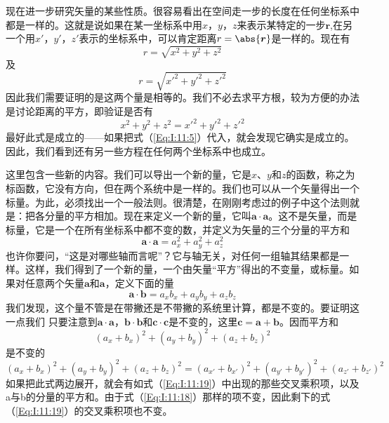 现在进一步研究矢量的某些性质。很容易看出在空间走一步的长度在任何坐标系中都是一样的。这就是说如果在某一坐标系中用$x$，$y$，$z$来表示某特定的一步$\boldsymbol{r}$,在另一个用$x'$，$y'$，$z'$表示的坐标系中，可以肯定距离$r=\abs{\boldsymbol{r}}$是一样的。现在有
\begin{equation*}
    r=\sqrt{x^2+y^2+z^2}
\end{equation*}
及
\begin{equation*}
    r=\sqrt{x'^2+y'^2+z'^2}
\end{equation*}
因此我们需要证明的是这两个量是相等的。我们不必去求平方根，较为方便的办法是讨论距离的平方，即验证是否有
\begin{equation}
    \label{Eq:I:11:17}
    x^2+y^2+z^2=x'^2+y'^2+z'^2
\end{equation}
最好此式是成立的——如果把式（\ref{Eq:I:11:5}）代入，就会发现它确实是成立的。因此，我们看到还有另一些方程在任何两个坐标系中也成立。

这里包含一些新的内容。我们可以导出一个新的量，它是$x$、$y$和$z$的函数，称之为标函数，它没有方向，但在两个系统中是一样的。我们也可以从一个矢量得出一个标量。为此，必须找出一个一般法则。很清楚，在刚刚考虑过的例子中这个法则就是：把各分量的平方相加。现在来定义一个新的量，它叫$\boldsymbol{a} \cdot \boldsymbol{a}$。这不是矢量，而是标量，它是一个在所有坐标系中都不变的数，并定义为矢量的三个分量的平方和
\begin{equation}
    \label{Eq:I:11:18}
    \boldsymbol{a} \cdot \boldsymbol{a}=a_x^2+a_y^2+a_z^2
\end{equation}
也许你要问，“这是对哪些轴而言呢”？它与轴无关，对任何一组轴其结果都是一样。这样，我们得到了一个新的量，一个由矢量“平方”得出的不变量，或标量。如果对任意两个矢量$\boldsymbol{a}$和$\boldsymbol{a}$，定义下面的量
\begin{equation}
    \label{Eq:I:11:19}
    \boldsymbol{a} \cdot \boldsymbol{b}=a_xb_x+a_yb_y+a_zb_z
\end{equation}
我们发现，这个量不管是在带撇还是不带撇的系统里计算，都是不变的。要证明这一点我们
只要注意到$\boldsymbol{a} \cdot \boldsymbol{a}$，$\boldsymbol{b} \cdot \boldsymbol{b}$和$\boldsymbol{c} \cdot \boldsymbol{c}$是不变的，这里$\boldsymbol{c}=\boldsymbol{a}+\boldsymbol{b}$。因而平方和
\begin{equation*}
    (a_x+b_x)^2+(a_y+b_y)^2+(a_z+b_z)^2
\end{equation*}
是不变的
\begin{equation}
    \label{Eq:I:11:20}
    (a_x+b_x)^2+(a_y+b_y)^2+(a_z+b_z)^2=(a_{x'}+b_{x'})^2+(a_{y'}+b_{y'})^2+(a_{z'}+b_{z'})^2
\end{equation}
如果把此式两边展开，就会有如式（\ref{Eq:I:11:19}）中出现的那些交叉乘积项，以及a与b的分量的平方和。由于式（\ref{Eq:I:11:18}）那样的项不变，因此剩下的式（\ref{Eq:I:11:19}）的交叉乘积项也不变。

